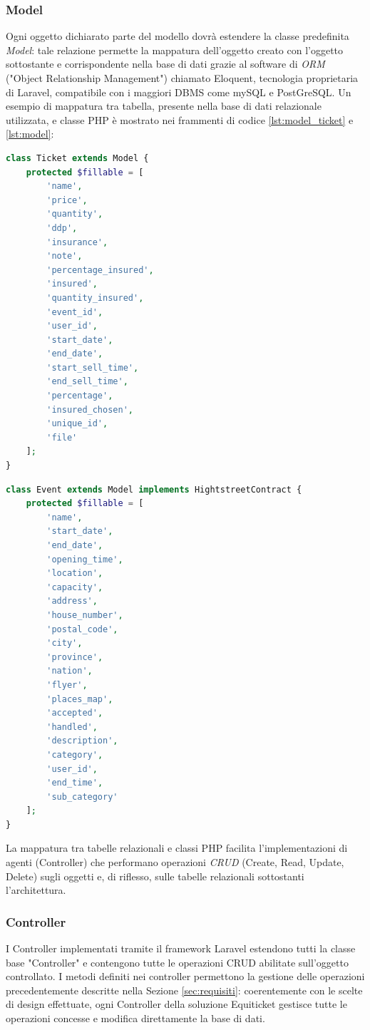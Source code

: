 \subsubsection{Model}
Ogni oggetto dichiarato parte del modello dovrà estendere la classe predefinita \textit{Model}: tale relazione permette la mappatura dell'oggetto creato con l'oggetto sottostante e corrispondente nella base di dati grazie al software di \textit{ORM} ("Object Relationship Management") chiamato Eloquent, tecnologia proprietaria di Laravel, compatibile con i maggiori DBMS come mySQL e PostGreSQL.
Un esempio di mappatura tra tabella, presente nella base di dati relazionale utilizzata, e classe PHP è mostrato nei frammenti di codice \ref{lst:model_ticket} e \ref{lst:model}: 
\begin{lstlisting}[language=PHP, caption={Mappatura della tabella Ticket e del corrispondente oggetto PHP}, label={lst:model_ticket}]
class Ticket extends Model {
	protected $fillable = [
		'name',
		'price',
		'quantity',
		'ddp',
		'insurance',
		'note',
		'percentage_insured',
		'insured',
		'quantity_insured',
		'event_id',
		'user_id',
		'start_date',
		'end_date',
		'start_sell_time',
		'end_sell_time',
		'percentage',
		'insured_chosen',
		'unique_id',
		'file'
	];
}
\end{lstlisting}
\begin{lstlisting}[language=PHP, caption={Mappatura tra tabella Event e corrispondente oggetto PHP}, label={lst:model_event}]
class Event extends Model implements HightstreetContract {
	protected $fillable = [
		'name',
		'start_date',
		'end_date',
		'opening_time',
		'location',
		'capacity',
		'address',
		'house_number',
		'postal_code',
		'city',
		'province',
		'nation',
		'flyer',
		'places_map',
		'accepted',
		'handled',
		'description',
		'category',
		'user_id',
		'end_time',
		'sub_category'
	];
}
\end{lstlisting}
La mappatura tra tabelle relazionali e classi PHP facilita l'implementazioni di agenti (Controller) che performano operazioni \emph{CRUD} (Create, Read, Update, Delete) sugli oggetti e, di riflesso, sulle tabelle relazionali sottostanti l'architettura. 

\subsubsection{Controller}
I Controller implementati tramite il framework Laravel estendono tutti la classe base "Controller" e contengono tutte le operazioni CRUD abilitate sull'oggetto controllato. I metodi definiti nei controller permettono la gestione delle operazioni precedentemente descritte nella Sezione \ref{sec:requisiti}: coerentemente con le scelte di design effettuate, ogni Controller della soluzione Equiticket gestisce tutte le operazioni concesse e modifica direttamente la base di dati. 
